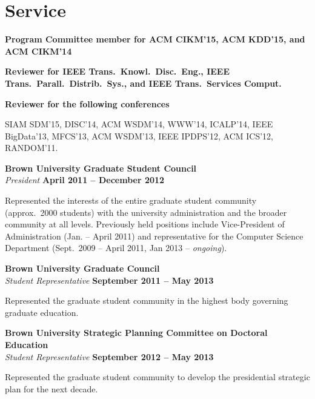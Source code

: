 \documentclass[margin,line]{resume}
\begin{document}
\section{\sc Service}
{\bf Program Committee member for ACM CIKM'15, ACM KDD'15, and ACM CIKM'14}

{\bf Reviewer for IEEE Trans.~Knowl.~Disc.~Eng., IEEE
Trans.~Parall.~Distrib.~Sys., and IEEE Trans.~Services Comput.}

{\bf Reviewer for the following conferences}
\begin{list2}
\vspace*{.05in}
\item SIAM SDM'15, DISC'14, ACM WSDM'14, WWW'14, ICALP'14, IEEE BigData'13,
	MFCS'13, ACM WSDM'13, IEEE IPDPS'12, ACM ICS'12, RANDOM'11.
\end{list2}

{\bf Brown University Graduate Student Council}\\
{\em President} \hfill {\bf April 2011 -- December 2012}

\begin{list2}
\vspace*{.05in}
\item Represented the interests of the entire graduate student community
  (approx.~2000 students) with the university administration and the broader
  community at all levels. Previously held positions include Vice-President of
  Administration (Jan. -- April 2011) and representative for the Computer Science
  Department (Sept.~2009 -- April 2011, Jan 2013 -- \emph{ongoing}).
\end{list2}

{\bf Brown University Graduate Council}\\
{\em Student Representative} \hfill {\bf September 2011 -- May 2013}

\begin{list2}
\vspace*{.05in}
\item Represented the graduate student community in the highest
  body governing graduate education.
\end{list2}

{\bf Brown University Strategic Planning Committee on Doctoral Education}\\
{\em Student Representative} \hfill {\bf September 2012 -- May 2013}

\begin{list2}
\vspace*{.05in}
\item Represented the graduate student community to develop
  the presidential strategic plan for the next decade.
\end{list2}
\end{document}
